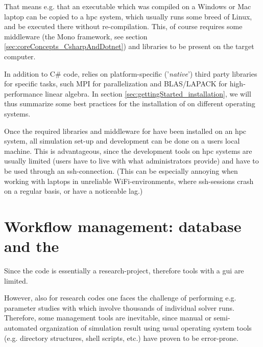\documentclass[a4paper,10pt]{report} %
\begin{document}
That means e.g. that an executable which was compiled on a Windows or Mac laptop can be copied 
to a \ac{hpc} system, which usually runs some breed of Linux, and be executed there without re-compilation.
This, of course requires some middleware (the Mono framework, see section \ref{sec:coreConcepts_CsharpAndDotnet})
and libraries to be present on the target computer.

In addition to C\# code,  \BoSSS{} relies on platform-specific ('\emph{native}') third party libraries for specific tasks, 
such MPI for parallelization and BLAS/LAPACK for high-performance linear algebra. In 
section \ref{sec:gettingStarted_installation}, we will thus 
summarize some best practices for the installation of \BoSSS{} on different operating systems.

Once the required libraries and middleware for \BoSSS{} have been installed on an 
\ac{hpc} system, all simulation set-up and development can be done 
on a users local machine.
This is advantageous, since the development tools on \ac{hpc} systems are usually limited
(users have to live with what administrators provide)
and have to be used through an ssh-connection.
(This can be especially annoying when working with laptops in unreliable WiFi-environments,
where ssh-sessions crash on a regular basis, or have a noticeable lag.)

\section{Workflow management: database and the \BoSSSpad}
\label{sec:coreConcepts_BoSSSpad}
Since the \BoSSS{} code is essentially a research-project, therefore 
tools with a \ac{gui}  are limited.

However, also for research codes  one faces the challenge of performing 
e.g. parameter studies with which involve thousands of individual 
solver runs.
Therefore, some management tools are inevitable, since manual or semi-automated
organization of simulation result using usual operating system tools (e.g. 
directory structures, shell scripts, etc.) have proven to be error-prone.
\end{document}
